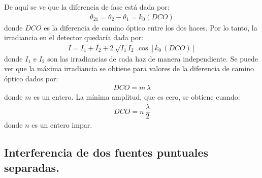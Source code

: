 \documentclass[14pt]{extarticle}
\begin{document}
De aquí se ve que la diferencia de fase está dada por:
\begin{align}
\theta_{21} = \theta_{2} - \theta_{1} = k_{0} (DCO)
\label{eq:ecuacion_IX_06}
\end{align}
donde $DCO$ es la diferencia de camino óptico entre los dos haces. Por lo tanto, la irradiancia en el detector quedaría dada por:
\begin{align}
I = I_{1} + I_{2} + 2 \, \sqrt{I_{1} \, I_{2}} \, \cos \left[ k_{0} \, (DCO) \right]
\label{eq:ecuacion_IX_07}
\end{align}
donde $I_{1}$ e $I_{2}$ son las irradiancias de cada haz de manera independiente. Se puede ver que la máxima irradiancia se obtiene para valores de la diferencia de camino óptico dados por: 
\begin{align}
DCO = m \, \lambda
\label{eq:ecuacion_IX_08}
\end{align}
donde $m$ es un entero. La mínima amplitud, que es cero, se obtiene cuando:
\begin{align}
DCO = n \, \dfrac{\lambda}{2}
\label{eq:ecuacion_IX_09}
\end{align}
donde $n$ es un entero impar.

\subsection{Interferencia  de dos fuentes puntuales separadas.}
\end{document}
